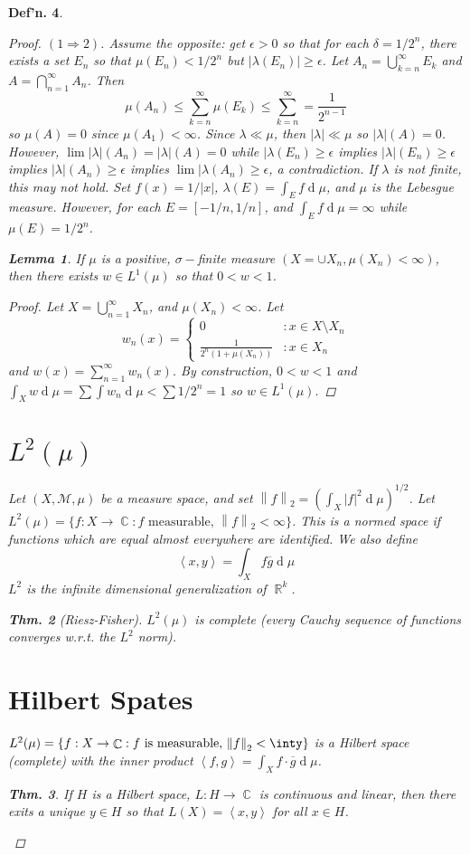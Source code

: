 \documentclass[12pt, a4paper]{book}
\DeclareMathOperator{\R}{\mathbb{R}}
\DeclareMathOperator{\C}{\mathbb{C}}
\renewcommand{\d}[1]{\ensuremath{\operatorname{d}\!{#1}}} %
\newcommand{\inner}[2]{\left\langle #1, #2 \right\rangle} %
\newcommand{\norm}[1]{\left\lVert#1\right\rVert} %
\newtheorem{theorem}{Thm.}[section]
\newtheorem{lemma}[theorem]{Lemma}
\newtheorem{definition}[theorem]{Def'n.}
\theoremstyle{nonumberplain}
\newtheorem{proof}{Proof}
\begin{document}
\begin{definition}
\begin{proof}
    $(1\Rightarrow 2)$.
    Assume the opposite: get $\epsilon>0$ so that for each $\delta=1/2^n$, there exists a set $E_n$ so that $\mu(E_n)<1/2^n$ but $|\lambda(E_n)|\geq\epsilon$.
    Let $A_n=\bigcup\limits_{k=n}^\infty E_k$ and $A=\bigcap\limits_{n=1}^\infty A_n$.
    Then
    \[\mu(A_n)\leq\sum\limits_{k=n}^\infty\mu(E_k)\leq\sum\limits_{k=n}^\infty=\frac{1}{2^{n-1}}\]
    so $\mu(A)=0$ since $\mu(A_1)<\infty$.
    Since $\lambda\ll\mu$, then $|\lambda|\ll\mu$ so $|\lambda|(A)=0$.
    However, $\lim|\lambda|(A_n)=|\lambda|(A)=0$ while $|\lambda(E_n)\geq\epsilon$ implies $|\lambda|(E_n)\geq\epsilon$ implies $|\lambda|(A_n)\geq\epsilon$ implies $\lim|\lambda(A_n)\geq\epsilon$, a contradiction.
If $\lambda$ is not finite, this may not hold.
Set $f(x)=1/|x|$, $\lambda(E)=\int_Ef\d{\mu}$, and $\mu$ is the Lebesgue measure.
However, for each $E=[-1/n,1/n]$, and $\int_Ef\d{\mu}=\infty$ while $\mu(E)=1/2^n$.
\begin{lemma}
    If $\mu$ is a positive, $\sigma-$finite measure $(X=\cup X_n,\mu(X_n)<\infty)$, then there exists $w\in L^1(\mu)$ so that $0<w<1$.
\end{lemma}
\begin{proof}
    Let $X=\bigcup\limits_{n=1}^\infty X_n$, and $\mu(X_n)<\infty$.
    Let
    \[w_n(x)=
        \begin{cases}
            0 &:x\in X\setminus X_n\\
            \frac{1}{2^n(1+\mu(X_n))} &: x\in X_n
        \end{cases}
    \]
    and $w(x)=\sum\limits_{n=1}^\infty w_n(x)$.
    By construction, $0<w<1$ and $\int_X w\d{\mu}=\sum\int w_n\d{\mu}<\sum 1/2^n=1$ so $w\in L^1(\mu)$.
\end{proof}
\section{$L^2(\mu)$}
Let $(X,\mathcal{M},\mu)$ be a measure space, and set $\norm{f}_2=\left(\int_X |f|^2\d{\mu}\right)^{1/2}$.
Let $L^2(\mu)=\{f:X\to\C:f\text{ measurable, }\norm{f}_2<\infty\}$.
This is a normed space if functions which are equal almost everywhere are identified.
We also define
\[\inner{x}{y}=\int_Xf\overline{g}\d{\mu}\]
$L^2$ is the infinite dimensional generalization of $\R^k$.
\begin{theorem}[Riesz-Fisher]
    $L^2(\mu)$ is complete (every Cauchy sequence of functions converges w.r.t. the $L^2$ norm).
\end{theorem}

\section{Hilbert Spates}
$L^2(\mu)=\{f:X\to\C:f\text{ is measurable, $\norm{f}_2<\inty$}\}$ is a Hilbert space (complete) with the inner product $\inner{f}{g}=\int_Xf\cdot\overline{g}\d{\mu}$.
\begin{theorem}
    If $H$ is a Hilbert space, $L:H\to\C$ is continuous and linear, then there exits a unique $y\in H$ so that $L(X)=\inner{x}{y}$ for all $x\in H$.
\end{theorem}


\end{proof}
\end{definition}
\end{document}
